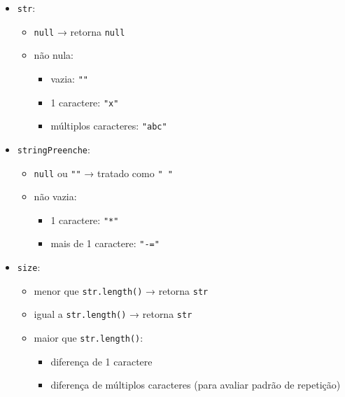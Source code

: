\documentclass[
  letterpaper,
  DIV=11,
  numbers=noendperiod]{scrartcl}
\providecommand{\tightlist}{%
  \setlength{\itemsep}{0pt}\setlength{\parskip}{0pt}}
\begin{document}
\begin{itemize}
\tightlist
\item
  \texttt{str}:

  \begin{itemize}
  \tightlist
  \item
    \texttt{null} → retorna \texttt{null}
  \item
    não nula:

    \begin{itemize}
    \tightlist
    \item
      vazia: \texttt{""}
    \item
      1 caractere: \texttt{"x"}
    \item
      múltiplos caracteres: \texttt{"abc"}
    \end{itemize}
  \end{itemize}
\item
  \texttt{stringPreenche}:

  \begin{itemize}
  \tightlist
  \item
    \texttt{null} ou \texttt{""} → tratado como \texttt{"\ "}
  \item
    não vazia:

    \begin{itemize}
    \tightlist
    \item
      1 caractere: \texttt{"*"}
    \item
      mais de 1 caractere: \texttt{"-="}
    \end{itemize}
  \end{itemize}
\item
  \texttt{size}:

  \begin{itemize}
  \tightlist
  \item
    menor que \texttt{str.length()} → retorna \texttt{str}
  \item
    igual a \texttt{str.length()} → retorna \texttt{str}
  \item
    maior que \texttt{str.length()}:

    \begin{itemize}
    \tightlist
    \item
      diferença de 1 caractere
    \item
      diferença de múltiplos caracteres (para avaliar padrão de
      repetição)
    \end{itemize}
  \end{itemize}
\end{itemize}
\end{document}

